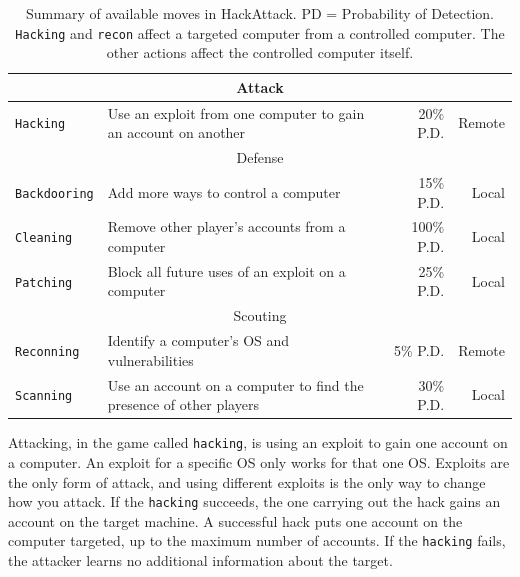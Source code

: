 \documentclass{sig-alternate-05-2015}
\newcommand{\highlightrow}{}  %
\begin{document}
\begin{table}
\begin{center}
\begin{tabular}{|l|l|r|r|}
\hline 
\highlightrow \multicolumn{4}{|c|}{Attack} \\
\hline 
{\tt Hacking} & Use an exploit from one computer to gain an account on another &  20\% P.D. & Remote \\
\hline 
\highlightrow \multicolumn{4}{|c|}{Defense} \\
\hline 
{\tt Backdooring} & Add more ways to control a computer & 15\% P.D.  & Local \\
{\tt Cleaning} & Remove other player's accounts from a computer & 100\% P.D. & Local \\
{\tt Patching} & Block all future uses of an exploit on a computer & 25\% P.D.  & Local \\
\hline 
\highlightrow \multicolumn{4}{|c|}{Scouting} \\
\hline 
{\tt Reconning} & Identify a computer's OS and vulnerabilities & 5\% P.D. & Remote \\
{\tt Scanning} & Use an account on a computer to find the presence of other players & 30\% P.D. 
& Local \\
\hline
\end{tabular}
\caption{Summary of available moves in HackAttack. PD = Probability of Detection. {\tt Hacking} and {\tt recon} affect a targeted computer from a controlled computer. The other actions affect the controlled computer itself.\label{tab:moves}}
\end{center}
\end{table}

Attacking, in the game called {\tt hacking}, is using an exploit to gain one account on a computer.
An exploit for a specific OS only works for that one OS.  
Exploits are the only form of attack, and using different exploits is the only way to change how you attack. If the {\tt hacking} succeeds, the one carrying out the hack gains an account on the target machine.  
A successful hack puts one account on the computer targeted, up to the maximum number of accounts. 
If the {\tt hacking} fails, the attacker learns no additional information about the target. 
\end{document}
